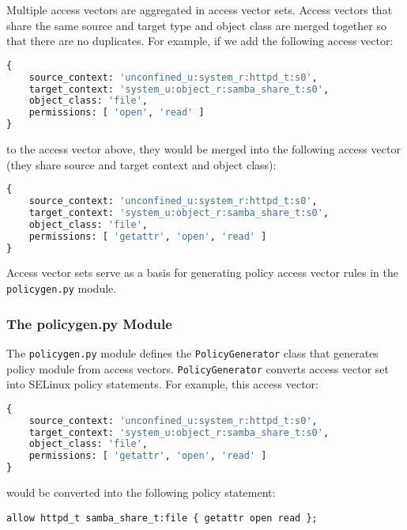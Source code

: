 Multiple access vectors are aggregated in access vector sets. Access vectors
that share the same source and target type and object class are merged together
so that there are no duplicates. For example, if we add the following access
vector:
\begin{lstlisting}[language=Python]
{
    source_context: 'unconfined_u:system_r:httpd_t:s0',
    target_context: 'system_u:object_r:samba_share_t:s0',
    object_class: 'file',
    permissions: [ 'open', 'read' ]
}
\end{lstlisting}
to the access vector above, they would be merged into the following access
vector (they share source and target context and object class):
\begin{lstlisting}[language=Python]
{
    source_context: 'unconfined_u:system_r:httpd_t:s0',
    target_context: 'system_u:object_r:samba_share_t:s0',
    object_class: 'file',
    permissions: [ 'getattr', 'open', 'read' ]
}
\end{lstlisting}

Access vector sets serve as a basis for generating policy access vector rules
in the \texttt{policygen.py} module.

\subsubsection{The policygen.py Module}
The \texttt{policygen.py} module defines the \texttt{PolicyGenerator} class that
generates policy module from access vectors. \texttt{PolicyGenerator} converts
access vector set into SELinux policy statements. For example, this access
vector:
\begin{lstlisting}[language=Python]
{
    source_context: 'unconfined_u:system_r:httpd_t:s0',
    target_context: 'system_u:object_r:samba_share_t:s0',
    object_class: 'file',
    permissions: [ 'getattr', 'open', 'read' ]
}
\end{lstlisting}
would be converted into the following policy statement:
\begin{lstlisting}
allow httpd_t samba_share_t:file { getattr open read };
\end{lstlisting}

